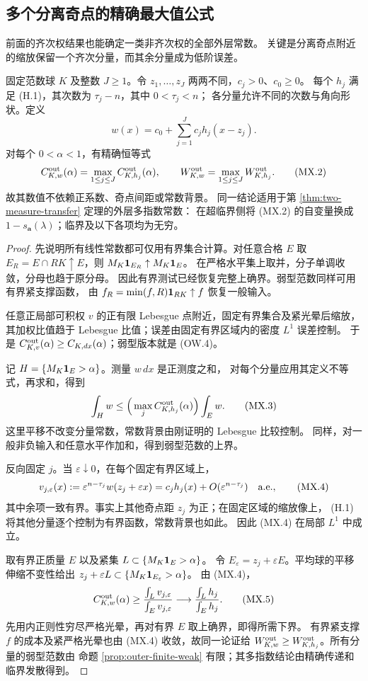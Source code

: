 \subsection{多个分离奇点的精确最大值公式}\label{subsec:separated-mixture}
前面的齐次权结果也能确定一类非齐次权的全部外层常数。
关键是分离奇点附近的缩放保留一个齐次分量，而其余分量成为低阶误差。

\begin{theorem}[分离齐次奇点的最大值公式]\label{thm:separated-mixture}
固定范数球 $K$ 及整数 $J\ge1$。令 $z_1,\ldots,z_J$ 两两不同，$c_j>0$、$c_0\ge0$。
每个 $h_j$ 满足 (H.1)，其次数为 $\tau_j-n$，其中 $0<\tau_j<n$；
各分量允许不同的次数与角向形状。定义
\[w(x)=c_0+\sum_{j=1}^J c_jh_j(x-z_j).\tag{MX.1}\]
对每个 $0<\alpha<1$，有精确恒等式
\[C^{\rm out}_{K,w}(\alpha)=\max_{1\le j\le J}C^{\rm out}_{K,h_j}(\alpha),
\qquad W^{\rm out}_{K,w}=\max_{1\le j\le J}W^{\rm out}_{K,h_j}.\tag{MX.2}\]
故其数值不依赖正系数、奇点间距或常数背景。
同一结论适用于第 \ref{thm:two-measure-transfer} 定理的外层多指数常数：
在超临界侧将 (MX.2) 的自变量换成 $1-s_{\boldsymbol a}(\lambda)$；临界及以下各项均为无穷。
\end{theorem}
\begin{proof}
先说明所有线性常数都可仅用有界集合计算。对任意合格 $E$ 取
$E_R=E\cap RK\uparrow E$，则 $M_K\mathbf 1_{E_R}\uparrow M_K\mathbf 1_E$。
在严格水平集上取并，分子单调收敛，分母也趋于原分母。
因此有界测试已经恢复完整上确界。弱型范数同样可用有界紧支撑函数，
由 $f_R=\min(f,R)\mathbf 1_{RK}\uparrow f$ 恢复一般输入。

任意正局部可积权 $v$ 的正有限 Lebesgue 点附近，固定有界集合及紧光晕后缩放，
其加权比值趋于 Lebesgue 比值；误差由固定有界区域内的密度 $L^1$ 误差控制。
于是 $C^{\rm out}_{K,v}(\alpha)\ge C_{K,dx}(\alpha)$；弱型版本就是 (OW.4)。

记 $H=\{M_K\mathbf 1_E>\alpha\}$。测量 $w\,dx$ 是正测度之和，
对每个分量应用其定义不等式，再求和，得到
\[\int_Hw\le\Big(\max_j C^{\rm out}_{K,h_j}(\alpha)\Big)\int_Ew.
\tag{MX.3}\]
这里平移不改变分量常数，常数背景由刚证明的 Lebesgue 比较控制。
同样，对一般非负输入和任意水平作加和，得到弱型范数的上界。

反向固定 $j$。当 $\varepsilon\downarrow0$，在每个固定有界区域上，
\[v_{j,\varepsilon}(x):=\varepsilon^{n-\tau_j}w(z_j+\varepsilon x)
=c_jh_j(x)+O(\varepsilon^{n-\tau_j})\quad\hbox{a.e.},\tag{MX.4}\]
其中余项一致有界。事实上其他奇点距 $z_j$ 为正；在固定区域的缩放像上，
(H.1) 将其他分量逐个控制为有界函数，常数背景也如此。
因此 (MX.4) 在局部 $L^1$ 中成立。

取有界正质量 $E$ 以及紧集 $L\subset\{M_K\mathbf 1_E>\alpha\}$。
令 $E_\varepsilon=z_j+\varepsilon E$。平均球的平移伸缩不变性给出
$z_j+\varepsilon L\subset\{M_K\mathbf 1_{E_\varepsilon}>\alpha\}$。
由 (MX.4)，
\[C^{\rm out}_{K,w}(\alpha)\ge
\frac{\int_L v_{j,\varepsilon}}{\int_Ev_{j,\varepsilon}}
\longrightarrow\frac{\int_Lh_j}{\int_Eh_j}.\tag{MX.5}\]
先用内正则性穷尽严格光晕，再对有界 $E$ 取上确界，即得所需下界。
有界紧支撑 $f$ 的成本及紧严格光晕也由 (MX.4) 收敛，故同一论证给
$W^{\rm out}_{K,w}\ge W^{\rm out}_{K,h_j}$。所有分量的弱型范数由
命题 \ref{prop:outer-finite-weak} 有限；其多指数结论由精确传递和临界发散得到。
\end{proof}

